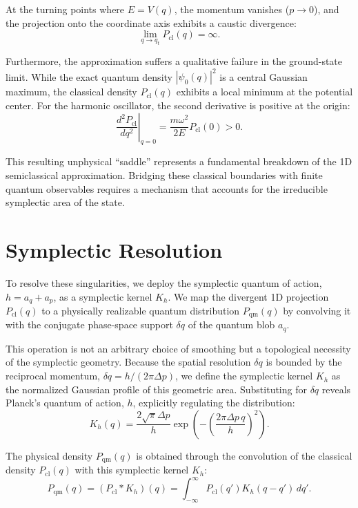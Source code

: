 \documentclass[%
  aps, reprint, prl, amsmath,amssymb
]{revtex4-2}
\begin{document}
At the turning points where $E = V(q)$, the momentum vanishes ($p \to 0$), and the projection onto the coordinate axis exhibits a caustic divergence:
\begin{equation}
\lim_{q \to q_t} P_{\text{cl}}(q) = \infty.
\end{equation}

Furthermore, the approximation suffers a qualitative failure in the ground-state limit. While the exact quantum density $|\psi_0(q)|^2$ is a central Gaussian maximum, the classical density $P_{\text{cl}}(q)$ exhibits a local minimum at the potential center. For the harmonic oscillator, the second derivative is positive at the origin:
\begin{equation}
\left. \frac{d^2 P_{\text{cl}}}{dq^2} \right|_{q=0} = \frac{m\omega^2}{2E} P_{\text{cl}}(0) > 0.
\end{equation}

This resulting unphysical ``saddle'' represents a fundamental breakdown of the 1D semiclassical approximation. Bridging these classical boundaries with finite quantum observables requires a mechanism that accounts for the irreducible symplectic area of the state.


\section{Symplectic Resolution}

To resolve these singularities, we deploy the symplectic quantum of action, $h = a_q + a_p$, as a symplectic kernel $K_h$. We map the divergent 1D projection $P_{\text{cl}}(q)$ to a physically realizable quantum distribution $P_{\text{qm}}(q)$ by convolving it with the conjugate phase-space support $\delta q$ of the quantum blob $a_q$. 

This operation is not an arbitrary choice of smoothing but a topological necessity of the symplectic geometry. Because the spatial resolution $\delta q$ is bounded by the reciprocal momentum, $\delta q = h / (2\pi \Delta p)$, we define the symplectic kernel $K_h$ as the normalized Gaussian profile of this geometric area. Substituting for $\delta q$ reveals Planck's quantum of action, $h$, explicitly regulating the distribution:
$$K_h(q) = \frac{2\sqrt{\pi} \Delta p}{h} \exp\left( - \left( \frac{2\pi \Delta p \, q}{h} \right)^2 \right).$$

The physical density $P_{\text{qm}}(q)$ is obtained through the convolution of the classical density $P_{\text{cl}}(q)$ with this symplectic kernel $K_h$:
$$P_{\text{qm}}(q) = (P_{\text{cl}} * K_h)(q) = \int_{-\infty}^{\infty} P_{\text{cl}}(q') K_h(q - q') \, dq'.$$
\end{document}
